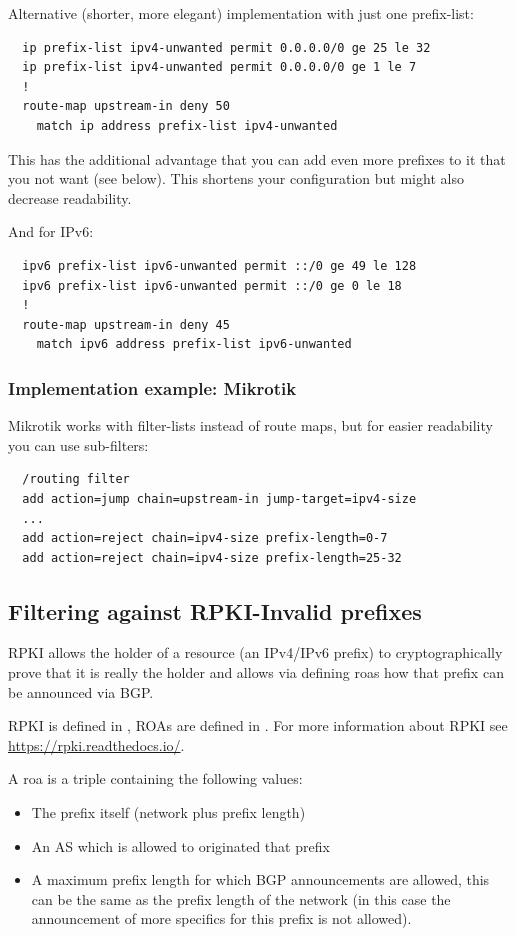 Alternative (shorter, more elegant) implementation with just one prefix-list:
\begin{verbatim}
  ip prefix-list ipv4-unwanted permit 0.0.0.0/0 ge 25 le 32
  ip prefix-list ipv4-unwanted permit 0.0.0.0/0 ge 1 le 7
  !
  route-map upstream-in deny 50
    match ip address prefix-list ipv4-unwanted
\end{verbatim}
This has the additional advantage that you can add even more prefixes to it that you not want (see below). This shortens your configuration but might also decrease readability.

And for IPv6:
\begin{verbatim}
  ipv6 prefix-list ipv6-unwanted permit ::/0 ge 49 le 128
  ipv6 prefix-list ipv6-unwanted permit ::/0 ge 0 le 18
  !
  route-map upstream-in deny 45
    match ipv6 address prefix-list ipv6-unwanted
\end{verbatim}

\subsubsection{Implementation example: Mikrotik}
Mikrotik works with filter-lists instead of route maps, but for easier readability you can use sub-filters:
\begin{verbatim}
  /routing filter
  add action=jump chain=upstream-in jump-target=ipv4-size
  ...
  add action=reject chain=ipv4-size prefix-length=0-7
  add action=reject chain=ipv4-size prefix-length=25-32
\end{verbatim}

\subsection{Filtering against RPKI-Invalid prefixes}
\gls{RPKI} allows the holder of a resource (an IPv4/IPv6 prefix) to cryptographically prove that it is really the holder and allows via defining \glspl{roa} how that prefix can be announced via BGP.

RPKI is defined in , ROAs are defined in . For more information about RPKI see \url{https://rpki.readthedocs.io/}.

A \gls{roa} is a triple containing the following values:
\begin{itemize}
  \item The prefix itself (network plus prefix length)
  \item An \gls{AS} which is allowed to originated that prefix
  \item A maximum prefix length for which BGP announcements are allowed, this can be the same as the prefix length of the network (in this case the announcement of more specifics for this prefix is not allowed).
\end{itemize}

